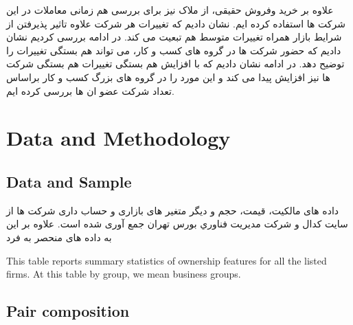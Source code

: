 \documentclass[12pt, a4paper]{article}
\begin{document}
علاوه بر خرید وفروش حقیقی، از ملاک 
نیز برای بررسی هم زمانی معاملات در این شرکت ها استفاده کرده ایم. نشان دادیم که تغییرات 
هر شرکت علاوه تاثیر پذیرفتن از شرایط بازار همراه تغییرات متوسط 
هم تبعیت می کند. در ادامه بررسی کردیم نشان دادیم که حضور شرکت ها در گروه های کسب و کار، می تواند هم بستگی تغییرات 
را توضیح دهد. در ادامه نشان دادیم که با افزایش هم بستگی تغییرات
هم بستگی شرکت ها نیز افزایش پیدا می کند و این مورد را در گروه های بزرگ کسب و کار براساس تعداد شرکت عضو ان ها بررسی کرده ایم.




\section{Data and Methodology}



\subsection{Data and Sample}

داده های مالکیت، قیمت، حجم و دیگر متغیر های بازاری و حساب داری شرکت ها از سایت کدال و شركت مديريت فناوري بورس تهران جمع آوری شده است. علاوه بر این به داده های منحصر به فرد 


 \begin{table}[htbp]
        \centering
        \caption{ This table reports summary statistics of ownership features for all the listed firms. At this table by group, we mean business groups.}
        \label{t2-1}
        \resizebox{1\textwidth}{!}
        {
        
         }
      \end{table}

\subsection{Pair composition }

 
 
\end{document}
